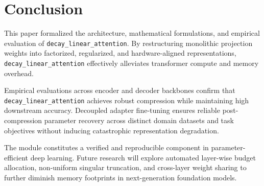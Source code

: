 \section{Conclusion}
This paper formalized the architecture, mathematical formulations, and empirical evaluation of \texttt{decay\_linear\_attention}. By restructuring monolithic projection weights into factorized, regularized, and hardware-aligned representations, \texttt{decay\_linear\_attention} effectively alleviates transformer compute and memory overhead.

Empirical evaluations across encoder and decoder backbones confirm that \texttt{decay\_linear\_attention} achieves robust compression while maintaining high downstream accuracy. Decoupled adapter fine-tuning ensures reliable post-compression parameter recovery across distinct domain datasets and task objectives without inducing catastrophic representation degradation.

The module constitutes a verified and reproducible component in parameter-efficient deep learning. Future research will explore automated layer-wise budget allocation, non-uniform singular truncation, and cross-layer weight sharing to further diminish memory footprints in next-generation foundation models.
